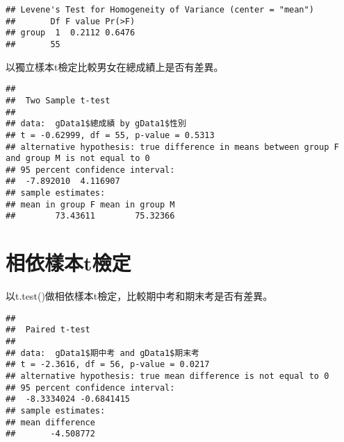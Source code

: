 \documentclass[
]{book}
\newenvironment{Shaded}{\begin{snugshade}}{\end{snugshade}}
\newcommand{\AttributeTok}[1]{\textcolor[rgb]{0.77,0.63,0.00}{#1}}
\newcommand{\ConstantTok}[1]{\textcolor[rgb]{0.00,0.00,0.00}{#1}}
\newcommand{\FunctionTok}[1]{\textcolor[rgb]{0.00,0.00,0.00}{#1}}
\newcommand{\NormalTok}[1]{#1}
\newcommand{\SpecialCharTok}[1]{\textcolor[rgb]{0.00,0.00,0.00}{#1}}
\begin{document}
\begin{verbatim}
## Levene's Test for Homogeneity of Variance (center = "mean")
##       Df F value Pr(>F)
## group  1  0.2112 0.6476
##       55
\end{verbatim}

以獨立樣本t檢定比較男女在總成績上是否有差異。

\begin{Shaded}
\end{Shaded}

\begin{verbatim}
## 
##  Two Sample t-test
## 
## data:  gData1$總成績 by gData1$性別
## t = -0.62999, df = 55, p-value = 0.5313
## alternative hypothesis: true difference in means between group F and group M is not equal to 0
## 95 percent confidence interval:
##  -7.892010  4.116907
## sample estimates:
## mean in group F mean in group M 
##        73.43611        75.32366
\end{verbatim}

\hypertarget{ux76f8ux4f9dux6a23ux672ctux6aa2ux5b9a}{%
\section{相依樣本t檢定}\label{ux76f8ux4f9dux6a23ux672ctux6aa2ux5b9a}}

以t.test()做相依樣本t檢定，比較期中考和期末考是否有差異。

\begin{Shaded}
\end{Shaded}

\begin{verbatim}
## 
##  Paired t-test
## 
## data:  gData1$期中考 and gData1$期末考
## t = -2.3616, df = 56, p-value = 0.0217
## alternative hypothesis: true mean difference is not equal to 0
## 95 percent confidence interval:
##  -8.3334024 -0.6841415
## sample estimates:
## mean difference 
##       -4.508772
\end{verbatim}
\end{document}
